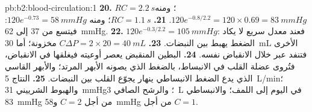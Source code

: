 \begin{solution}{pb:b2:blood-circulation:1}
\textbf{20.} $RC = \qty{2.2}{s}$؛ ومنه $120e^{-0.8/2.2} = 120\times 0.69 =
\qty{83}{mmHg}$.
\textbf{21.} $RC = \qty{1.1}{s}$؛ ومنه $120e^{-0.73} = \qty{58}{mmHg}$: فيتسع
 من 37 إلى \qty{62}{mmHg}.
\textbf{22.} $120e^{-0.3/2.2} = \qty{105}{mmHg}$: فعند معدل سريع لا
يكاد الضغط يهبط بين النبضات.
\textbf{23.} $C\Delta P = 2\times 20 = \qty{40}{mL}$ مخزونة؛ أما
\qty{30}{mL} الأخرى فتنفد عبر  خلال الانقباض نفسه.
\textbf{24.} البطين المنقبض يعصر أوعيته فيغلقها
في الانقباض، فتُروى عضلة القلب في الانبساط، بالضغط
الذي يصونه الأبهر المرتد؛ والأبهر القاسي الذي يدع
الضغط الانبساطي ينهار يجوّع القلب بين النبضات.
\textbf{25.} النتاج \qty{5}{L/min}؛ والهبوط الشرييني \qty{31}{mmHg}؛
والرشح الصافي \qty{3}{L} في اليوم إلى اللمف؛ والانبساطي \qty{83}{mmHg}
من أجل $C = 2$ و\qty{58}{mmHg} من أجل $C = 1$.
\end{solution}

